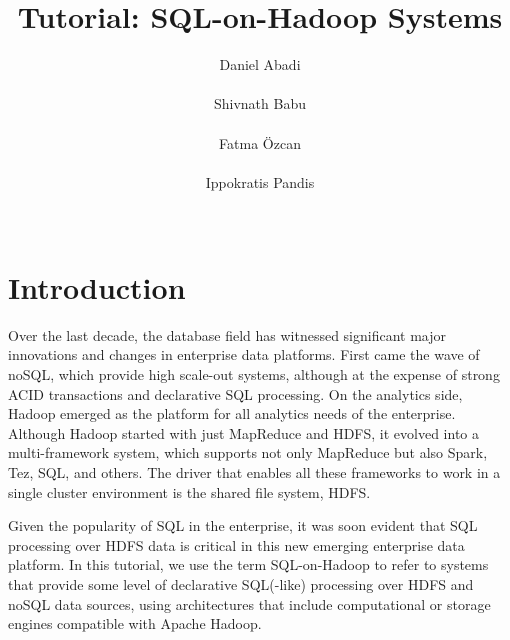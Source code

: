 \documentclass{vldb}
\begin{document}
\title{Tutorial: SQL-on-Hadoop Systems}


\author{
\alignauthor
Daniel Abadi\\
\\
\alignauthor
Shivnath Babu\\
\\
\alignauthor
Fatma  {\"O}zcan\\
\\
\alignauthor
Ippokratis Pandis\\
\\
}



\maketitle




\section{Introduction}

Over the last decade, the database field has witnessed significant major innovations and changes in enterprise data platforms. First came the wave of noSQL, which provide high scale-out systems, although at the expense of strong ACID transactions and declarative SQL processing. On the analytics side, Hadoop emerged as the platform for all analytics needs of the enterprise. Although Hadoop started with just MapReduce and HDFS, it evolved into a multi-framework system, which supports not only MapReduce but also Spark, Tez, SQL, and others. The driver that enables all these frameworks to work in a single cluster environment is the shared file system, HDFS. 

Given the popularity of SQL in the enterprise, it was soon evident that SQL processing over HDFS data is critical in this new emerging enterprise data platform. In this tutorial, we use the term SQL-on-Hadoop to refer to systems that provide some level of declarative SQL(-like) processing over HDFS and noSQL data sources, using architectures that include computational or storage engines compatible with Apache Hadoop.
\end{document}
